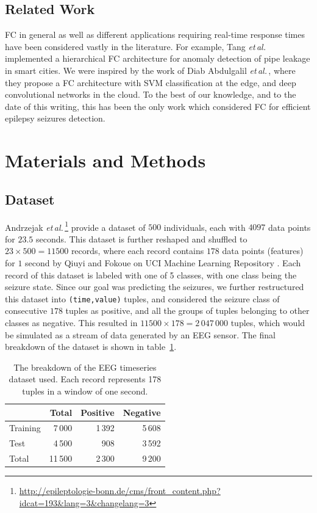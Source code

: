 \documentclass[letterpaper]{article}
\newcommand{\etal}{\emph{et\,al.}\,}
\begin{document}
\subsection{Related Work}
FC in general as well as different applications requiring real-time response times have been considered vastly in the literature. For example, Tang \etal\cite{Tang:2015} implemented a hierarchical FC architecture for anomaly detection of pipe leakage in smart cities. We were inspired by the work of Diab Abdulgalil \etal\cite{DiabAbdulgalil2018}, where they propose a FC architecture with SVM classification at the edge, and deep convolutional networks in the cloud. To the best of our knowledge, and to the date of this writing, this has been the only work which considered FC for efficient epilepsy seizures detection.


 \section{Materials and Methods}\label{materials}

 \subsection{Dataset}
 Andrzejak \etal\cite{PhysRevE.64.061907}\footnote{\url{http://epileptologie-bonn.de/cms/front_content.php?idcat=193&lang=3&changelang=3}} provide a dataset of \(500\) individuals, each with \(4097\) data points for \(23.5\) seconds. This dataset is further reshaped and shuffled to \(23 \times 500 = 11500\) records, where each record contains \(178\) data points (features) for \(1\) second by Qiuyi and Fokoue on UCI Machine Learning Repository \cite{UCIDataset}. Each record of this dataset is labeled with one of 5 classes, with one class being the seizure state. Since our goal was predicting the seizures, we further restructured this dataset into \texttt{(time,value)} tuples, and considered the seizure class of consecutive \(178\) tuples as positive, and all the groups of tuples belonging to other classes as negative. This resulted in \(11500 \times 178 = 2\,047\,000\) tuples, which would be simulated as a stream of data generated by an EEG sensor. The final breakdown of the dataset is shown in table~\ref{tab.dataset}.

\begin{table}
  \centering
  \caption{The breakdown of the EEG timeseries dataset used. Each record represents 178 tuples in a window of one second.}
  \label{tab.dataset}
  {\begin{tabular}{@{} lrrr @{}}
    \toprule
      & Total & Positive & Negative\\
    \midrule
    Training & 7\,000 & 1\,392 & 5\,608\\
    Test & 4\,500& 908 & 3\,592\\
    \addlinespace
    Total & 11\,500 & 2\,300 & 9\,200\\
    \bottomrule
  \end{tabular}}
\end{table}
\end{document}

